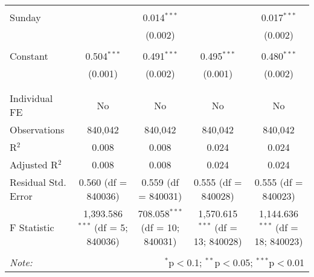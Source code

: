 \documentclass[
]{article}
\begin{document}
\begin{table}[!htbp]
{\begin{tabular}{@{\extracolsep{5pt}}lcccc}
  & & & & \\ 
 Sunday &  & 0.014$^{***}$ &  & 0.017$^{***}$ \\ 
  &  & (0.002) &  & (0.002) \\ 
  & & & & \\ 
 Constant & 0.504$^{***}$ & 0.491$^{***}$ & 0.495$^{***}$ & 0.480$^{***}$ \\ 
  & (0.001) & (0.002) & (0.001) & (0.002) \\ 
  & & & & \\ 
\hline \\[-1.8ex] 
Individual FE & No & No & No & No \\ 
Observations & 840,042 & 840,042 & 840,042 & 840,042 \\ 
R$^{2}$ & 0.008 & 0.008 & 0.024 & 0.024 \\ 
Adjusted R$^{2}$ & 0.008 & 0.008 & 0.024 & 0.024 \\ 
Residual Std. Error & 0.560 (df = 840036) & 0.559 (df = 840031) & 0.555 (df = 840028) & 0.555 (df = 840023) \\ 
F Statistic & 1,393.586$^{***}$ (df = 5; 840036) & 708.058$^{***}$ (df = 10; 840031) & 1,570.615$^{***}$ (df = 13; 840028) & 1,144.636$^{***}$ (df = 18; 840023) \\ 
\hline 
\hline \\[-1.8ex] 
\textit{Note:}  & \multicolumn{4}{r}{$^{*}$p$<$0.1; $^{**}$p$<$0.05; $^{***}$p$<$0.01} \\ 
\end{tabular}
} 
\end{table} 
\newpage
\end{document}
